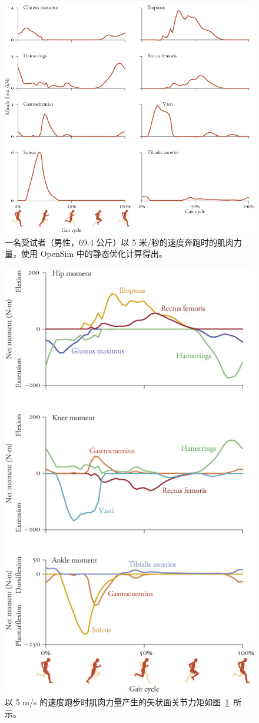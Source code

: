 \begin{figure}[!htb]
	\centering
	\includegraphics[width=1.0\linewidth]{chap9/9_12}
	\caption{一名受试者（男性，69.4 公斤）以 5 米/秒的速度奔跑时的肌肉力量，使用 OpenSim 中的静态优化计算得出\cite{hamner2013muscle}。 \label{fig:9_12}}
\end{figure}


\begin{figure}[!htb]
	\centering
	\includegraphics[width=0.8\linewidth]{chap9/9_13}
	\caption{以 5 m/s 的速度跑步时肌肉力量产生的矢状面关节力矩如图~\ref{fig:9_12}~所示。 \label{fig:9_13}}
\end{figure}














